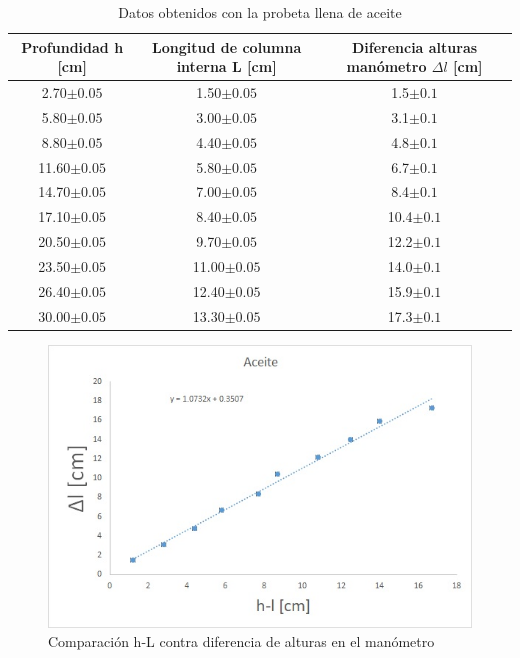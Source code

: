 \documentclass[a4paper]{article}
\begin{document}
\begin{table}[H]
  \centering
    \begin{tabular}{|c|c|c|} \hline
    Profundidad \textbf{h} [cm] & Longitud de columna interna \textbf{L} [cm] & Diferencia alturas manómetro \textbf{$\Delta l$} [cm]\\ \hline
    2.70$\pm0.05$  & 1.50$\pm0.05$  & 1.5$\pm0.1$ \\ \hline
    5.80$\pm0.05$  & 3.00$\pm0.05$  & 3.1$\pm0.1$ \\ \hline
    8.80$\pm0.05$  & 4.40$\pm0.05$  & 4.8$\pm0.1$ \\ \hline
    11.60$\pm0.05$ & 5.80$\pm0.05$  & 6.7$\pm0.1$ \\ \hline
    14.70$\pm0.05$ & 7.00$\pm0.05$  & 8.4$\pm0.1$ \\ \hline
    17.10$\pm0.05$ & 8.40$\pm0.05$  & 10.4$\pm0.1$ \\ \hline
    20.50$\pm0.05$ & 9.70$\pm0.05$  & 12.2$\pm0.1$ \\ \hline
    23.50$\pm0.05$ & 11.00$\pm0.05$ & 14.0$\pm0.1$ \\ \hline
    26.40$\pm0.05$ & 12.40$\pm0.05$ & 15.9$\pm0.1$ \\ \hline
    30.00$\pm0.05$ & 13.30$\pm0.05$ & 17.3$\pm0.1$ \\ \hline
    \end{tabular}%
    \caption{Datos obtenidos con la probeta llena de aceite}
\end{table}%

\begin{figure}[H]
    \centering
    \includegraphics[width=12cm]{GRF-A.jpg}
    \caption{Comparación h-L contra diferencia de alturas en el manómetro}
\end{figure}
\end{document}
